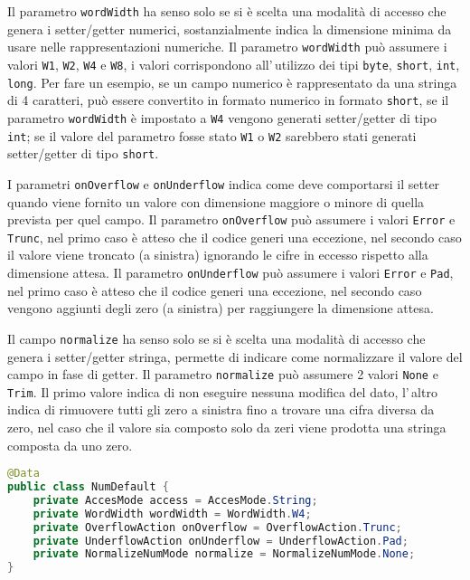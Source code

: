 \documentclass[a4paper,10pt]{report}
\begin{document}
Il parametro \verb!wordWidth! ha senso solo se si è scelta una modalità di
accesso che genera i setter/getter numerici, sostanzialmente indica la 
dimensione minima da usare nelle rappresentazioni numeriche.
Il parametro \verb!wordWidth! può assumere i valori \verb!W1!, \verb!W2!, 
\verb!W4! e \verb!W8!, i valori corrispondono all'\,utilizzo dei tipi
\verb!byte!, \verb!short!, \verb!int!, \verb!!\verb!long!.
Per fare un esempio, se un campo numerico è rappresentato da una stringa di 4 
caratteri, può essere convertito in formato numerico in formato \verb!short!,
se il parametro \verb!wordWidth! è impostato a \verb!W4! vengono generati
setter/getter di tipo \verb!int!; se il valore del parametro fosse stato 
\verb!W1! o  \verb!W2! sarebbero stati generati setter/getter di tipo 
\verb!short!.

I parametri \verb!onOverflow! e \verb!onUnderflow! indica come deve comportarsi
il setter quando viene fornito un valore con dimensione maggiore o minore di
quella prevista per quel campo.
Il parametro \verb!onOverflow! può assumere i valori \verb!Error! e 
\verb!Trunc!, nel primo caso è atteso che il codice generi una eccezione,
nel secondo caso il valore viene troncato (a sinistra) ignorando le cifre in
eccesso rispetto alla dimensione attesa.
Il parametro \verb!onUnderflow! può assumere i valori \verb!Error! e \verb!Pad!,
nel primo caso è atteso che il codice generi una eccezione, nel secondo caso
vengono aggiunti degli zero (a sinistra) per raggiungere la dimensione attesa.

Il campo \verb!normalize! ha senso solo se si è scelta una modalità di
accesso che genera i setter/getter stringa, permette di indicare come 
normalizzare il valore del campo in fase di getter.
Il parametro \verb!normalize! può assumere 2 valori \verb!None! e \verb!Trim!. 
Il primo valore indica di non eseguire nessuna modifica del dato,
l'\,altro indica di rimuovere tutti gli zero a sinistra fino a trovare
una cifra diversa da zero, nel caso che il valore sia composto solo da
zeri viene prodotta una stringa composta da uno zero.

\begin{figure*}[!htb]
\begin{lstlisting}[language=java, 
caption=class NumDefault (default campo numerico), 
label=lst:NumDefault]
@Data
public class NumDefault {
    private AccesMode access = AccesMode.String;
    private WordWidth wordWidth = WordWidth.W4;
    private OverflowAction onOverflow = OverflowAction.Trunc;
    private UnderflowAction onUnderflow = UnderflowAction.Pad;
    private NormalizeNumMode normalize = NormalizeNumMode.None;
}
\end{lstlisting}
\end{figure*}
\end{document}
